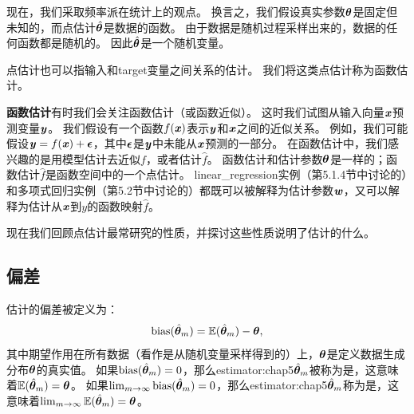 
现在，我们采取频率派在统计上的观点。
换言之，我们假设真实参数$\boldsymbol{\theta}$是固定但未知的，而点估计$\hat{\boldsymbol{\theta}}$是数据的函数。
由于数据是随机过程采样出来的，数据的任何函数都是随机的。
因此$\hat{\boldsymbol{\theta}}$是一个随机变量。


点估计也可以指输入和\gls{target}变量之间关系的估计。
我们将这类点估计称为函数估计。

\textbf{函数估计}\quad 有时我们会关注函数估计（或函数近似）。
这时我们试图从输入向量$\boldsymbol{\mathit{x}}$预测变量$\boldsymbol{\mathit{y}}$。
我们假设有一个函数$f(\boldsymbol{\mathit{x}})$表示$\boldsymbol{\mathit{y}}$和$\boldsymbol{\mathit{x}}$之间的近似关系。
例如，我们可能假设$\boldsymbol{\mathit{y}} = f(\boldsymbol{\mathit{x}}) + \boldsymbol{\epsilon}$，其中$\boldsymbol{\epsilon}$是$\boldsymbol{\mathit{y}}$中未能从$\boldsymbol{\mathit{x}}$预测的一部分。
在函数估计中，我们感兴趣的是用模型估计去近似$f$，或者估计$\hat{f}$。
函数估计和估计参数$\boldsymbol{\theta}$是一样的；函数估计$\hat{f}$是函数空间中的一个点估计。
\gls{linear_regression}实例（第5.1.4节中讨论的）和多项式回归实例（第5.2节中讨论的）都既可以被解释为估计参数$\boldsymbol{\mathit{w}}$，又可以解释为估计从$\boldsymbol{\mathit{x}}$到$y$的函数映射$\hat{f}$。

现在我们回顾点估计最常研究的性质，并探讨这些性质说明了估计的什么。

\subsection{偏差}
\label{sec:bias}
估计的偏差被定义为：
\begin{equation}
\label{eq:5.20}
    \text{bias}(\hat{\boldsymbol{\theta}}_m) = \mathbb{E}(\hat{\boldsymbol{\theta}}_m) - \boldsymbol{\theta},
\end{equation}
其中期望作用在所有数据（看作是从随机变量采样得到的）上，$\boldsymbol{\theta}$是定义数据生成分布$\boldsymbol{\theta}$的真实值。
如果$\text{bias}(\hat{\boldsymbol{\theta}}_m)=0$，那么\gls{estimator:chap5}$\hat{\boldsymbol{\theta}}_m$被称为是，这意味着$\mathbb{E}(\hat{\boldsymbol{\theta}}_m) = \boldsymbol{\theta}$。
如果$\lim_{m\to\infty} \text{bias}(\hat{\boldsymbol{\theta}}_m)=0$，那么\gls{estimator:chap5}$\hat{\boldsymbol{\theta}}_m$称为是，这意味着$\lim_{m\to\infty} \mathbb{E}(\hat{\boldsymbol{\theta}}_m) = \boldsymbol{\theta}$。


